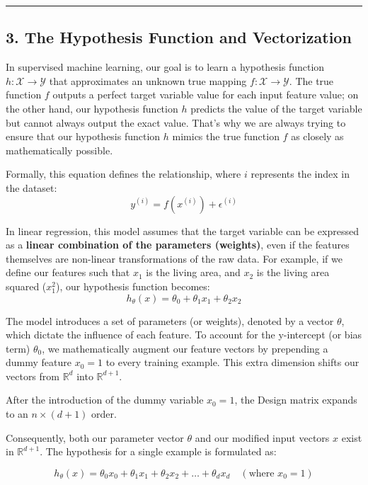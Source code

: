 \documentclass{article}
\begin{document}
\vspace{1em}
\noindent\rule{\textwidth}{0.4pt}
\vspace{1em}

\subsection*{3. The Hypothesis Function and Vectorization}

In supervised machine learning, our goal is to learn a hypothesis function $h : \mathcal{X} \to \mathcal{Y}$ that approximates an unknown true mapping $f : \mathcal{X} \to \mathcal{Y}$. The true function $f$ outputs a perfect target variable value for each input feature value; on the other hand, our hypothesis function $h$ predicts the value of the target variable but cannot always output the exact value. That's why we are always trying to ensure that our hypothesis function $h$ mimics the true function $f$ as closely as mathematically possible.

Formally, this equation defines the relationship, where $i$ represents the index in the dataset:
\[ y^{(i)} = f(x^{(i)}) + \epsilon^{(i)} \]

In linear regression, this model assumes that the target variable can be expressed as a \textbf{linear combination of the parameters (weights)}, even if the features themselves are non-linear transformations of the raw data. For example, if we define our features such that $x_1$ is the living area, and $x_2$ is the living area squared ($x_1^2$), our hypothesis function becomes:
\[ h_\theta(x) = \theta_0 + \theta_1 x_1 + \theta_2 x_2 \]

The model introduces a set of parameters (or weights), denoted by a vector $\theta$, which dictate the influence of each feature. To account for the y-intercept (or bias term) $\theta_0$, we mathematically augment our feature vectors by prepending a dummy feature $x_0 = 1$ to every training example. This extra dimension shifts our vectors from $\mathbb{R}^d$ into $\mathbb{R}^{d+1}$.

After the introduction of the dummy variable $x_0 = 1$, the Design matrix expands to an $n \times (d+1)$ order.

Consequently, both our parameter vector $\theta$ and our modified input vectors $x$ exist in $\mathbb{R}^{d+1}$. The hypothesis for a single example is formulated as:

\[ h_\theta(x) = \theta_0 x_0 + \theta_1 x_1 + \theta_2 x_2 + \dots + \theta_d x_d \quad (\text{where } x_0 = 1) \]
\end{document}
